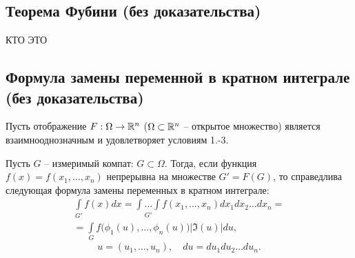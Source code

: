 \subsection{Теорема Фубини (без доказательства)}

КТО ЭТО

\subsection{Формула замены переменной в кратном интеграле (без доказательства)}

\begin{theorem}
    Пусть отображение $ F: \Omega \rightarrow \mathbb{R}^n $ ($ \Omega \subset \mathbb{R}^n $ -- открытое множество) является взаимнооднозначным и удовлетворяет условиям 1.-3.

    Пусть $ G $ -- измеримый компат: $ G \subset \Omega $. Тогда, если функция $ f(x) = f(x_1,\ldots,x_n) $ непрерывна на множестве $ G'=F(G) $, то справедлива следующая формула замены переменных в кратном интеграле:
    \begin{multline*}
        \int\limits_{G'}f(x)dx = \underset{G'}{\int\ldots\int}f(x_1,\ldots,x_n)dx_1dx_2\ldots dx_n = \\
        = \int\limits_G f\big(\phi_1(u),\ldots,\phi_n(u)\big)\big|\mathfrak{I}(u)\big|du,
    \end{multline*}
    \[
        u = (u_1,\ldots,u_n), \quad du = du_1du_2\ldots du_n.
    \]
\end{theorem}
